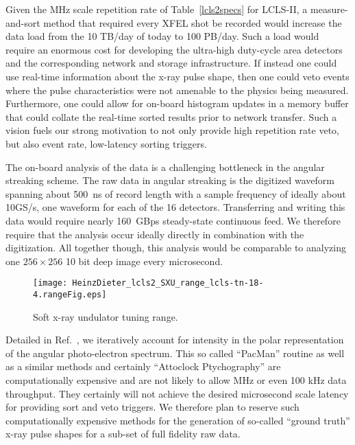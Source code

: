 Given the MHz scale repetition rate of Table~\ref{lcls2specs} for LCLS-II, a measure-and-sort method that required every XFEL shot be recorded would increase the data load from the 10 TB/day of today to 100 PB/day.
Such a load would require an enormous cost for developing the ultra-high duty-cycle area detectors and the corresponding network and storage infrastructure. 
If instead one could use real-time information about the x-ray pulse shape, then one could veto events where the pulse characteristics were not amenable to the physics being measured.
Furthermore, one could allow for on-board histogram updates in a memory buffer that could collate the real-time sorted results prior to network transfer.
Such a vision fuels our strong motivation to not only provide high repetition rate veto, but also event rate, low-latency sorting triggers.

The on-board analysis of the data is a challenging bottleneck in the angular streaking scheme.
The raw data in angular streaking is the digitized waveform spanning about 500~ns of record length with a sample frequency of ideally about 10GS/s, one waveform for each of the 16 detectors.
Transferring and writing this data would require nearly 160~GBps steady-state continuous feed.
We therefore require that the analysis occur ideally directly in combination with the digitization.
All together though, this analysis would be comparable to analyzing one $256\times256$ 10 bit deep image every microsecond.

\begin{wrapfigure}[18]{r}{3.5in}
\vspace{-1\baselineskip}
\centerline{
	\texttt{[image: HeinzDieter\_lcls2\_SXU\_range\_lcls-tn-18-4.rangeFig.eps]}
	}
\vspace{-1\baselineskip}
\caption{\label{fig::sxu_K} Soft x-ray undulator tuning range. \cite{HeinzDieter_SXU_twocolor}
	}
\end{wrapfigure}

Detailed in Ref.~\cite{Nick2018}, we iteratively account for intensity in the polar representation of the angular photo-electron spectrum.
This so called ``PacMan'' routine as well as a similar methods \cite{Thomas2015,Siqi2018,HJWorner2018} and certainly ``Attoclock Ptychography'' \cite{Thomas2018} are computationally expensive and are not likely to allow MHz or even 100 kHz data throughput.
They certainly will not achieve the desired microsecond scale latency for providing sort and veto triggers.
We therefore plan to reserve such computationally expensive methods for the generation of so-called ``ground truth'' x-ray pulse shapes for a sub-set of full fidelity raw data.

